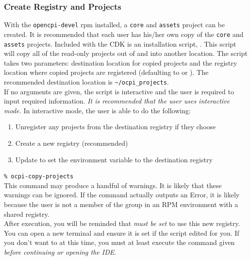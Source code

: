 \subsubsection{Create Registry and Projects}
\label{sec:create_projects}
With the \texttt{opencpi-devel} rpm installed, a \texttt{core} and \texttt{assets} project can be created. It is recommended that each user has his/her own copy of the \texttt{core} and \texttt{assets} projects. Included with the CDK is an installation script, .
This script will copy all of the read-only projects out of  and into another location.
The script takes two parameters: destination location for copied projects and the registry location where copied projects are registered (defaulting to  or ). The recommended destination location is \verb+~/ocpi_projects+. \\

If no arguments are given, the script is interactive and the user is required to
input required information. \textit{It is recommended that the user uses interactive mode.} In interactive mode, the user is able to do the
following:
\begin{enumerate}
\item Unregister any projects from the destination registry if they choose
\item Create a new registry (recommended)
\item Update  to set the environment variable  to the destination registry
\end{enumerate}

\verb+% ocpi-copy-projects+ \\

This command may produce a handful of warnings. It is likely that these warnings can be ignored. If the command actually outputs an Error, it is likely because the user is not a member of the  group in an RPM environment with a shared registry.\\

After execution, you will be reminded that  \textit{must be set} to use this new registry. You can open a new terminal and ensure it is set if the script edited  for you.
If you don't want to at this time, you must at least execute the  command given \textit{before continuing or opening the IDE}.\\

